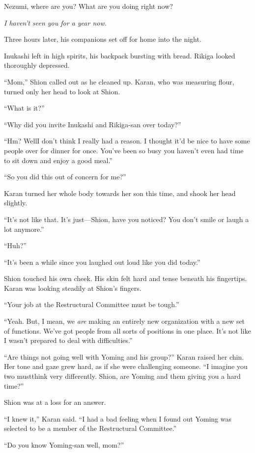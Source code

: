 Nezumi, where are you? What are you doing right now?

\emph{I haven't seen you for a year now.}

Three hours later, his companions set off for home into the night.

Inukashi left in high spirits, his backpack bursting with bread. Rikiga
looked thoroughly depressed.

``Mom,'' Shion called out as he cleaned up. Karan, who was measuring
flour, turned only her head to look at Shion.

``What is it?''

``Why did you invite Inukashi and Rikiga-san over today?''

``Hm? Well\el I don't think I really had a reason. I thought it'd be
nice to have some people over for dinner for once. You've been so busy
you haven't even had time to sit down and enjoy a good meal.''

``So you did this out of concern for me?''

Karan turned her whole body towards her son this time, and shook her
head slightly.

``It's not like that. It's just---Shion, have you noticed? You don't
smile or laugh a lot anymore.''

``Huh?''

``It's been a while since you laughed out loud like you did today.''

Shion touched his own cheek. His skin felt hard and tense beneath his
fingertips. Karan was looking steadily at Shion's fingers.

``Your job at the Restructural Committee must be tough.''

``Yeah. But, I mean, we \emph{are} making an entirely new organization with a
new set of functions. We've got people from all sorts of positions in
one place. It's not like I wasn't prepared to deal with difficulties.''

``Are things not going well with Yoming and his group?'' Karan raised
her chin. Her tone and gaze grew hard, as if she were challenging
someone. ``I imagine you two must\el think very differently. Shion, are
Yoming and them giving you a hard time?''

Shion was at a loss for an answer.

``I knew it,'' Karan said. ``I had a bad feeling when I found out Yoming
was selected to be a member of the Restructural Committee.''

``Do you know Yoming-san well, mom?''

